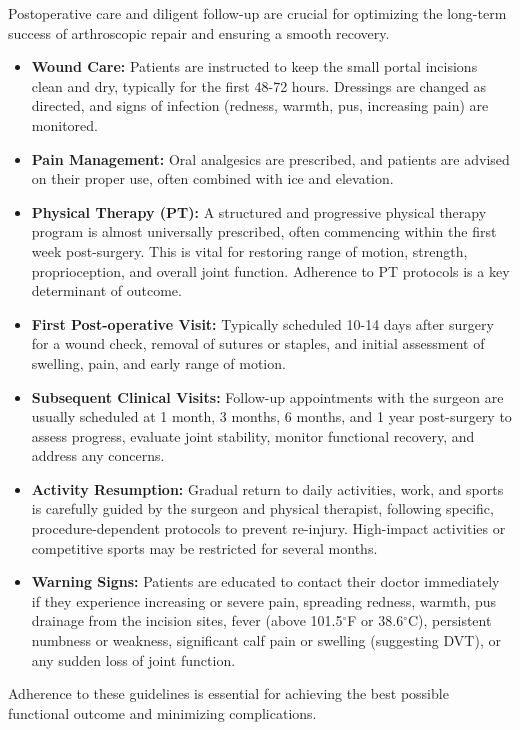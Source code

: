 Postoperative care and diligent follow-up are crucial for optimizing the long-term success of arthroscopic repair and ensuring a smooth recovery.
\begin{itemize}
  \item \textbf{Wound Care:} Patients are instructed to keep the small portal incisions clean and dry, typically for the first 48-72 hours. Dressings are changed as directed, and signs of infection (redness, warmth, pus, increasing pain) are monitored.
  \item \textbf{Pain Management:} Oral analgesics are prescribed, and patients are advised on their proper use, often combined with ice and elevation.
  \item \textbf{Physical Therapy (PT):} A structured and progressive physical therapy program is almost universally prescribed, often commencing within the first week post-surgery. This is vital for restoring range of motion, strength, proprioception, and overall joint function. Adherence to PT protocols is a key determinant of outcome.
  \item \textbf{First Post-operative Visit:} Typically scheduled 10-14 days after surgery for a wound check, removal of sutures or staples, and initial assessment of swelling, pain, and early range of motion.
  \item \textbf{Subsequent Clinical Visits:} Follow-up appointments with the surgeon are usually scheduled at 1 month, 3 months, 6 months, and 1 year post-surgery to assess progress, evaluate joint stability, monitor functional recovery, and address any concerns.
  \item \textbf{Activity Resumption:} Gradual return to daily activities, work, and sports is carefully guided by the surgeon and physical therapist, following specific, procedure-dependent protocols to prevent re-injury. High-impact activities or competitive sports may be restricted for several months.
  \item \textbf{Warning Signs:} Patients are educated to contact their doctor immediately if they experience increasing or severe pain, spreading redness, warmth, pus drainage from the incision sites, fever (above 101.5$^{\circ}$F or 38.6$^{\circ}$C), persistent numbness or weakness, significant calf pain or swelling (suggesting DVT), or any sudden loss of joint function.
\end{itemize}
Adherence to these guidelines is essential for achieving the best possible functional outcome and minimizing complications.

